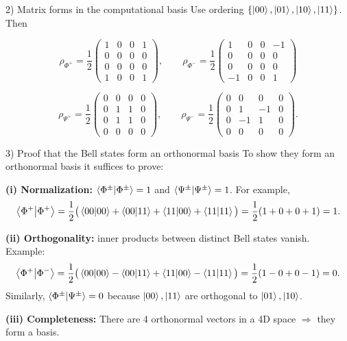 \documentclass[aspectratio=169]{beamer}
\begin{document}
\begin{frame}{2) Matrix forms in the computational basis}
Use ordering $\{\ket{00},\ket{01},\ket{10},\ket{11}\}$. Then

\[
\rho_{\Phi^{+}}=
\frac{1}{2}\begin{pmatrix}
1&0&0&1\\
0&0&0&0\\
0&0&0&0\\
1&0&0&1
\end{pmatrix},
\qquad
\rho_{\Phi^{-}}=
\frac{1}{2}\begin{pmatrix}
1&0&0&-1\\
0&0&0&0\\
0&0&0&0\\
-1&0&0&1
\end{pmatrix}
\]

\[
\rho_{\Psi^{+}}=
\frac{1}{2}\begin{pmatrix}
0&0&0&0\\
0&1&1&0\\
0&1&1&0\\
0&0&0&0
\end{pmatrix},
\qquad
\rho_{\Psi^{-}}=
\frac{1}{2}\begin{pmatrix}
0&0&0&0\\
0&1&-1&0\\
0&-1&1&0\\
0&0&0&0
\end{pmatrix}.
\]
\end{frame}

\begin{frame}{3) Proof that the Bell states form an orthonormal basis}
To show they form an orthonormal basis it suffices to prove:

\medskip
\textbf{(i) Normalization:} $\braket{\Phi^{\pm}}{\Phi^{\pm}}=1$ and $\braket{\Psi^{\pm}}{\Psi^{\pm}}=1$.
For example,
\[
\braket{\Phi^{+}}{\Phi^{+}}
=\frac{1}{2}\big(\braket{00}{00}+\braket{00}{11}+\braket{11}{00}+\braket{11}{11}\big)
=\frac{1}{2}(1+0+0+1)=1.
\]

\textbf{(ii) Orthogonality:} inner products between distinct Bell states vanish.
Example:
\[
\braket{\Phi^{+}}{\Phi^{-}}
=\frac{1}{2}\big(\braket{00}{00}-\braket{00}{11}+\braket{11}{00}-\braket{11}{11}\big)
=\frac{1}{2}(1-0+0-1)=0.
\]
Similarly, $\braket{\Phi^{\pm}}{\Psi^{\pm}}=0$ because $\ket{00},\ket{11}$ are orthogonal to $\ket{01},\ket{10}$.

\medskip
\textbf{(iii) Completeness:} There are 4 orthonormal vectors in a 4D space $\Rightarrow$ they form a basis.
\end{frame}
\end{document}
